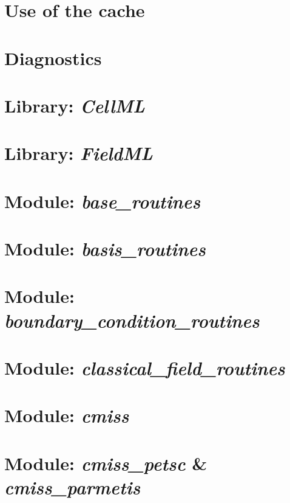 \section{Use of the cache}
\label{sec:cache}

\section{Diagnostics}
\label{sec:diagnostics}

\section{Library: \emph{CellML}}
\label{sec:cellml}

\section{Library: \emph{FieldML}}
\label{sec:fieldml}

\section{Module: \emph{base\_routines}}
\label{sec:baseroutines}

\section{Module: \emph{basis\_routines}}
\label{sec:basisroutines}

\section{Module: \emph{boundary\_condition\_routines}} 
\label{sec:boundaryconditionroutines}

\section{Module: \emph{classical\_field\_routines}}
\label{sec:classicalfieldroutines}

\section{Module: \emph{cmiss}}
\label{sec:cmiss}

\section{Module: \emph{cmiss\_petsc} \& \emph{cmiss\_parmetis}}
\label{sec:cmisspetscandcmissparmetis}

